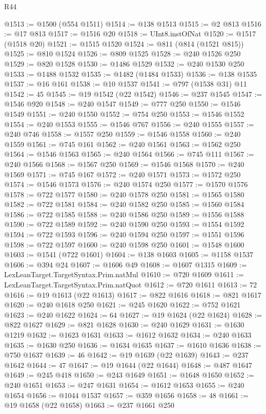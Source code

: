 \begin{lexlean}{R44}
\begin{coremodule}
@1513 := @1500 (@554 @1511)
@1514 := @138 @1513
@1515 := @2 @813
@1516 := @17 @813
@1517 := @1516 @20
@1518 := UInt8.instOfNat
@1520 := @1517 (@1518 @20)
@1521 := @1515 @1520
@1524 := @811 (@814 (@1521 @815))
@1525 := @810 @1524
@1526 := @809 @1525
@1528 := @240 @1526 @250
@1529 := @820 @1528
@1530 := @1486 @1529
@1532 := @240 @1530 @250
@1533 := @1488 @1532
@1535 := @1482 (@1484 @1533)
@1536 := @138 @1535
@1537 := @16 @161
@1538 := @10 @1537
@1541 := @797 (@1538 @31) @11
@1542 := 45
@1545 := @19 @1542 (@22 @1542)
@1546 := @237 @1545
@1547 := @1546 @920
@1548 := @240 @1547
@1549 := @777 @250
@1550 := @1546 @1549
@1551 := @240 @1550
@1552 := @754 @250
@1553 := @1546 @1552
@1554 := @240 @1553
@1555 := @1546 @767
@1556 := @240 @1555
@1557 := @240 @746
@1558 := @1557 @250
@1559 := @1546 @1558
@1560 := @240 @1559
@1561 := @745 @161
@1562 := @240 @1561
@1563 := @1562 @250
@1564 := @1546 @1563
@1565 := @240 @1564
@1566 := @745 @111
@1567 := @240 @1566
@1568 := @1567 @250
@1569 := @1546 @1568
@1570 := @240 @1569
@1571 := @745 @167
@1572 := @240 @1571
@1573 := @1572 @250
@1574 := @1546 @1573
@1576 := @240 @1574 @250
@1577 := @1570 @1576
@1578 := @722 @1577
@1580 := @240 @1578 @250
@1581 := @1565 @1580
@1582 := @722 @1581
@1584 := @240 @1582 @250
@1585 := @1560 @1584
@1586 := @722 @1585
@1588 := @240 @1586 @250
@1589 := @1556 @1588
@1590 := @722 @1589
@1592 := @240 @1590 @250
@1593 := @1554 @1592
@1594 := @722 @1593
@1596 := @240 @1594 @250
@1597 := @1551 @1596
@1598 := @722 @1597
@1600 := @240 @1598 @250
@1601 := @1548 @1600
@1603 := @1541 (@722 @1601)
@1604 := @138 @1603
@1605 := @1158 @1537
@1606 := @394 @24
@1607 := @1606 @49
@1608 := @1607 @1315
@1609 := LexLeanTarget.TargetSyntax.Prim.natMul
@1610 := @720 @1609
@1611 := LexLeanTarget.TargetSyntax.Prim.natQuot
@1612 := @720 @1611
@1613 := 72
@1616 := @19 @1613 (@22 @1613)
@1617 := @822 @1616
@1618 := @821 @1617
@1620 := @240 @1618 @250
@1621 := @245 @1620
@1622 := @752 @1621
@1623 := @240 @1622
@1624 := 64
@1627 := @19 @1624 (@22 @1624)
@1628 := @822 @1627
@1629 := @821 @1628
@1630 := @240 @1629
@1631 := @1630 @1219
@1632 := @1623 @1631
@1633 := @1612 @1632
@1634 := @240 @1633
@1635 := @1630 @250
@1636 := @1634 @1635
@1637 := @1610 @1636
@1638 := @750 @1637
@1639 := 46
@1642 := @19 @1639 (@22 @1639)
@1643 := @237 @1642
@1644 := 47
@1647 := @19 @1644 (@22 @1644)
@1648 := @487 @1647
@1649 := @245 @418
@1650 := @243 @1649
@1651 := @1648 @1650
@1652 := @240 @1651
@1653 := @247 @1631
@1654 := @1612 @1653
@1655 := @240 @1654
@1656 := @1044 @1537
@1657 := @359 @1656
@1658 := 48
@1661 := @19 @1658 (@22 @1658)
@1663 := @237 @1661 @250

\end{coremodule}
\end{lexlean}
